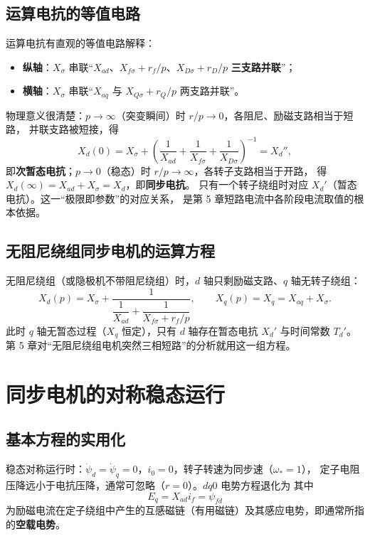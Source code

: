\subsection{运算电抗的等值电路}

运算电抗有直观的等值电路解释：
\begin{itemize}
  \item \textbf{纵轴}：$X_\sigma$ 串联“$X_{ad}$、$X_{f\sigma}+r_f/p$、$X_{D\sigma}+r_D/p$
        \textbf{三支路并联}”；
  \item \textbf{横轴}：$X_\sigma$ 串联“$X_{aq}$ 与 $X_{Q\sigma}+r_Q/p$ 两支路并联”。
\end{itemize}
物理意义很清楚：$p\to\infty$（突变瞬间）时 $r/p\to0$，各阻尼、励磁支路相当于短路，
并联支路被短接，得
\begin{equation}
  X_d(0)=X_\sigma+\left(\frac{1}{X_{ad}}+\frac{1}{X_{f\sigma}}+\frac{1}{X_{D\sigma}}\right)^{-1}
  =X_d'',
\end{equation}
即\textbf{次暂态电抗}；$p\to0$（稳态）时 $r/p\to\infty$，各转子支路相当于开路，
得 $X_d(\infty)=X_{ad}+X_\sigma=X_d$，即\textbf{同步电抗}。
只有一个转子绕组时对应 $X_d'$（暂态电抗）。这一“极限即参数”的对应关系，
是第 5 章短路电流中各阶段电流取值的根本依据。

\subsection{无阻尼绕组同步电机的运算方程}

无阻尼绕组（或隐极机不带阻尼绕组）时，$d$ 轴只剩励磁支路、$q$ 轴无转子绕组：
\begin{equation}
  X_d(p)=X_\sigma+\frac{1}{\dfrac{1}{X_{ad}}+\dfrac{1}{X_{f\sigma}+r_f/p}},\qquad
  X_q(p)=X_q=X_{aq}+X_\sigma .
\end{equation}
此时 $q$ 轴无暂态过程（$X_q$ 恒定），只有 $d$ 轴存在暂态电抗 $X_d'$ 与时间常数 $T_d'$。
第 5 章对“无阻尼绕组电机突然三相短路”的分析就用这一组方程。

\section{同步电机的对称稳态运行}

\subsection{基本方程的实用化}

稳态对称运行时：$\dot\psi_d=\dot\psi_q=0$，$i_0=0$，转子转速为同步速（$\omega_*=1$），
定子电阻压降远小于电抗压降，通常可忽略（$r=0$）。$dq0$ 电势方程退化为
其中
\begin{equation}
  E_q=X_{ad}i_f=\psi_{fd}
\end{equation}
为励磁电流在定子绕组中产生的互感磁链（有用磁链）及其感应电势，即通常所指的\textbf{空载电势}。

